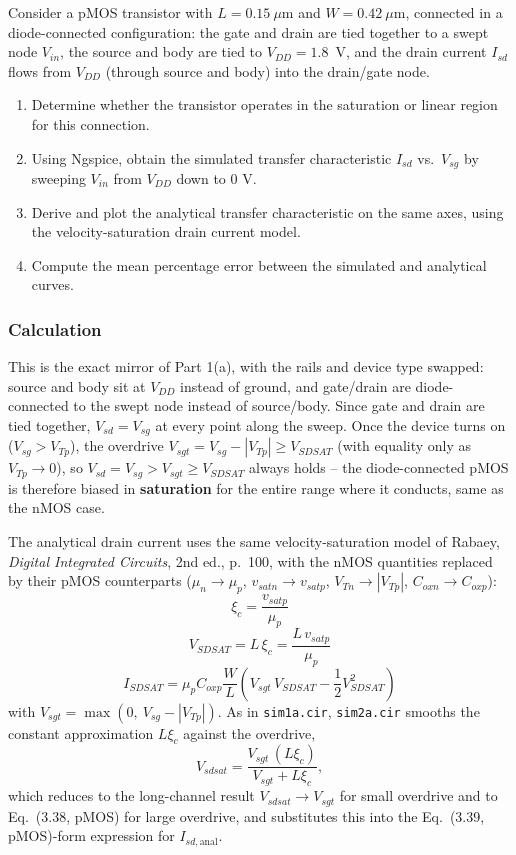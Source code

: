 Consider a pMOS transistor with $L = 0.15\ \mu\text{m}$ and $W = 0.42\ \mu\text{m}$, connected in a diode-connected configuration: the gate and drain are tied together to a swept node $V_{in}$, the source and body are tied to $V_{DD}=1.8$~V, and the drain current $I_{sd}$ flows from $V_{DD}$ (through source and body) into the drain/gate node.

\begin{enumerate}
  \item Determine whether the transistor operates in the saturation or linear region for this connection.
  \item Using Ngspice, obtain the simulated transfer characteristic $I_{sd}$ vs.\ $V_{sg}$ by sweeping $V_{in}$ from $V_{DD}$ down to 0 V.
  \item Derive and plot the analytical transfer characteristic on the same axes, using the velocity-saturation drain current model.
  \item Compute the mean percentage error between the simulated and analytical curves.
\end{enumerate}

\subsubsection{Calculation}

This is the exact mirror of Part 1(a), with the rails and device type swapped: source and body sit at $V_{DD}$ instead of ground, and gate/drain are diode-connected to the swept node instead of source/body. Since gate and drain are tied together, $V_{sd} = V_{sg}$ at every point along the sweep. Once the device turns on ($V_{sg} > V_{Tp}$), the overdrive $V_{sgt} = V_{sg} - |V_{Tp}| \geq V_{SDSAT}$ (with equality only as $V_{Tp}\to0$), so $V_{sd} = V_{sg} > V_{sgt} \geq V_{SDSAT}$ always holds -- the diode-connected pMOS is therefore biased in \textbf{saturation} for the entire range where it conducts, same as the nMOS case.

The analytical drain current uses the same velocity-saturation model of Rabaey, \emph{Digital Integrated Circuits}, 2nd ed., p.~100, with the nMOS quantities replaced by their pMOS counterparts ($\mu_n\to\mu_p$, $v_{satn}\to v_{satp}$, $V_{Tn}\to|V_{Tp}|$, $C_{oxn}\to C_{oxp}$):
\[
\xi_c = \frac{v_{satp}}{\mu_p} \tag{3.37, pMOS}
\]
\[
V_{SDSAT} = L\,\xi_c = \frac{L\,v_{satp}}{\mu_p} \tag{3.38, pMOS}
\]
\[
I_{SDSAT} = \mu_p C_{oxp} \frac{W}{L}\left(V_{sgt}\,V_{SDSAT} - \frac{1}{2}V_{SDSAT}^2\right) \tag{3.39, pMOS}
\]
with $V_{sgt} = \max(0,\ V_{sg}-|V_{Tp}|)$. As in \texttt{sim1a.cir}, \texttt{sim2a.cir} smooths the constant approximation $L\xi_c$ against the overdrive,
\[
V_{sdsat} = \frac{V_{sgt}\,(L\xi_c)}{V_{sgt}+L\xi_c},
\]
which reduces to the long-channel result $V_{sdsat}\to V_{sgt}$ for small overdrive and to Eq.~(3.38, pMOS) for large overdrive, and substitutes this into the Eq.~(3.39, pMOS)-form expression for $I_{sd,\text{anal}}$.

